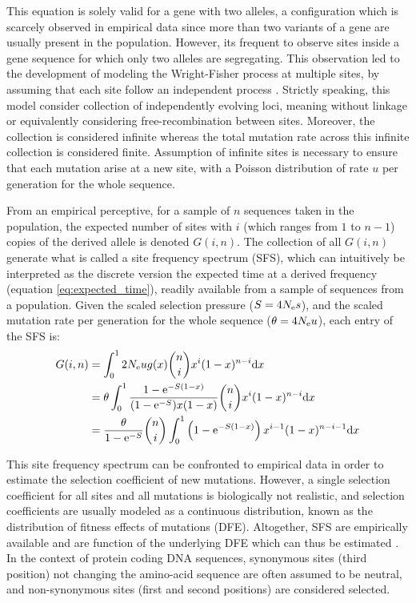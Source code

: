 This equation is solely valid for a gene with two alleles, a configuration which is scarcely observed in empirical data since more than two variants of a gene are usually present in the population.
However, its frequent to observe sites inside a gene sequence for which only two alleles are segregating.
This observation led to the development of modeling the Wright-Fisher process at multiple sites, by assuming that each site follow an independent process \citep{Sawyer1992}.
Strictly speaking, this model consider collection of independently evolving loci, meaning without linkage or equivalently considering free-recombination between sites.
Moreover, the collection is considered infinite whereas the total mutation rate across this infinite collection is considered finite.
Assumption of infinite sites is necessary to ensure that each mutation arise at a new site, with a Poisson distribution of rate $u$ per generation for the whole sequence.

From an empirical perceptive, for a sample of $n$ sequences taken in the population, the expected number of sites with $i$ (which ranges from $1$ to $n-1$) copies of the derived \gls{allele} is denoted $G(i, n)$. 
The collection of all $G(i, n)$ generate what is called a site frequency spectrum (\acrshort{SFS}), which can intuitively be interpreted as the discrete version the expected time at a derived frequency (equation \ref{eq:expected_time}), readily available from a sample of sequences from a population.
Given the scaled selection pressure ($S=4 N_{\textrm{e}} s$), and the scaled mutation rate per generation for the whole sequence ($\theta = 4 N_{\textrm{e}} u $), each entry of the \acrshort{SFS} is:
\begin{align}
	G(i, n) & = \int_{0}^{1}  2 N_{\textrm{e}} u g(x) \binom{n}{i} x^{i} (1-x)^{n-i} \mathrm{d} x \\
	& = \theta \int_{0}^{1} \dfrac{1 - \mathrm{e}^{-S(1-x)}}{(1 - \mathrm{e}^{-S})x(1-x)} \binom{n}{i} x^{i} (1-x)^{n-i} \mathrm{d} x \\
	& =  \dfrac{\theta }{1 - \mathrm{e}^{-S}} \binom{n}{i} \int_{0}^{1} \left( 1 - \mathrm{e}^{-S(1-x)} \right) x^{i-1} (1-x)^{n-i-1} \mathrm{d} x 
\end{align}

This site frequency spectrum can be confronted to empirical data in order to estimate the selection coefficient of new mutations.
However, a single selection coefficient for all sites and all mutations is biologically not realistic, and selection coefficients are usually modeled as a continuous distribution, known as the distribution of fitness effects of mutations (\acrshort{DFE}).
Altogether, \acrshort{SFS} are empirically available and are function of the underlying \acrshort{DFE} which can thus be estimated \citep{eyre-walker_distribution_2006, eyre-walker_estimating_2009}.
In the context of protein coding \acrshort{DNA} sequences, synonymous sites (third position) not changing the amino-acid sequence are often assumed to be \gls{neutral}, and non-synonymous sites (first and second positions) are considered selected. 

